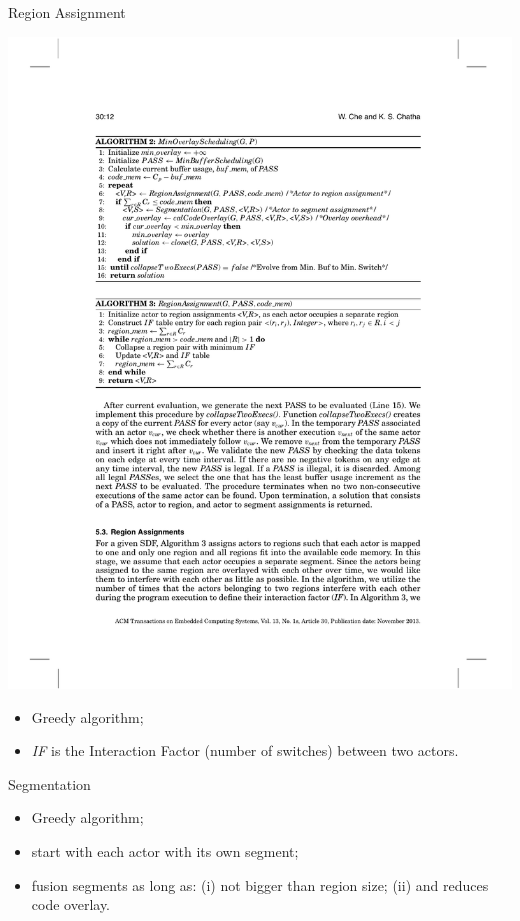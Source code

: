 \documentclass{beamer}
\begin{document}
\begin{frame}{Region Assignment}
  \begin{center}
    \hspace*{-0.1\textwidth}
    \includegraphics[width=1.2\textwidth]{algo3}
  \end{center}
  \begin{itemize}
    \item Greedy algorithm;
    \item \textit{IF} is the Interaction Factor (number of switches) between two actors.
  \end{itemize}
\end{frame}

\begin{frame}{Segmentation}
  \begin{itemize}
    \item Greedy algorithm;
    \item start with each actor with its own segment;
    \item fusion segments as long as: (i) not bigger than region size; (ii) and reduces code overlay.
  \end{itemize}
\end{frame}
\end{document}
